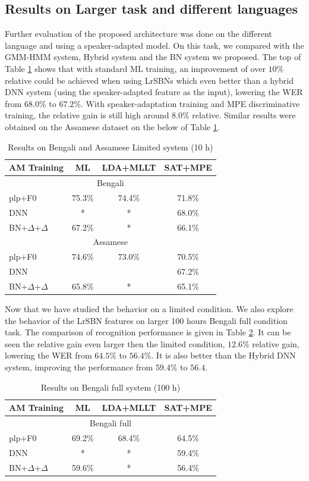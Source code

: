 \documentclass{article}
\begin{document}
\subsection{Results on Larger task and different languages}
Further evaluation of the proposed architecture was done on the different language and using a speaker-adapted model. On this task, we compared with the GMM-HMM system, Hybrid system and the BN system we proposed. The top of Table \ref{tab:limited} shows that with standard ML training, an improvement of over $10\%$ relative could be achieved when using LrSBNs which even better than a hybrid DNN system (using the speaker-adapted feature as the input), lowering the WER from $68.0\%$ to
$67.2\%$. With speaker-adaptation training and MPE discriminative training, the relative gain is still high around $8.0\%$ relative. Similar results were obtained on the Assamese dataset on the below of Table \ref{tab:limited}.
\begin{table}[htb]
  \centering
  \caption{Results on Bengali and Assamese Limited system (10 h)}
  \label{tab:limited}
  \begin{tabular}{|l|c|c|c|}
    \hline
    AM Training & ML & LDA+MLLT & SAT+MPE \\\hline\hline
    \multicolumn{4}{|c|}{Bengali}\\\hline
    plp+F0 & 75.3\% & 74.4\% & 71.8\% \\\hline
    DNN & * & * & 68.0\%\\\hline
    BN+$\Delta$+$\Delta$ & 67.2\% & * & 66.1\% \\\hline\hline
    \multicolumn{4}{|c|}{Assamese}\\\hline
    plp+F0 & 74.6\% & 73.0\% & 70.5\% \\\hline
    DNN & & & 67.2\%\\\hline
    BN+$\Delta$+$\Delta$ & 65.8\% & * & 65.1\% \\\hline\hline
  \end{tabular}
\end{table}

Now that we have studied the behavior on a limited condition. We also explore the behavior of the LrSBN features on larger 100 hours Bengali full condition task. The comparison of recognition performance is given in Table \ref{tab:full}. It can be seen the relative gain even larger then the limited condition, $12.6\%$ relative gain, lowering the WER from $64.5\%$ to $56.4\%$. It is also better than the Hybrid DNN system, improving the performance from $59.4\%$ to $56.4$.
\begin{table}[htb]
  \centering
  \caption{Results on Bengali full system (100 h)}
  \label{tab:full}
  \begin{tabular}{|l|c|c|c|}
    \hline
    AM Training & ML & LDA+MLLT & SAT+MPE \\\hline\hline
    \multicolumn{4}{|c|}{Bengali full}\\\hline
    plp+F0 & 69.2\% & 68.4\% & 64.5\% \\\hline
    DNN & * &* & 59.4\%\\\hline
    BN+$\Delta$+$\Delta$ & 59.6\% & * & 56.4\% \\\hline\hline
  \end{tabular}
\end{table}
\end{document}
